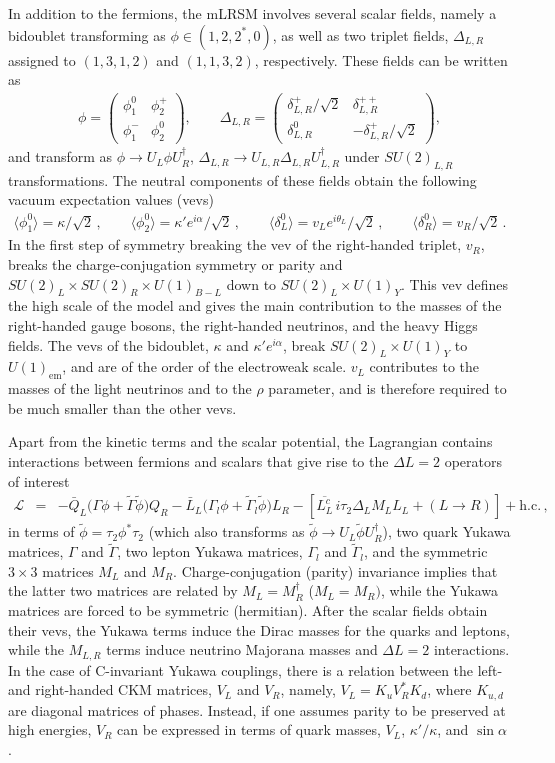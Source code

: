\documentclass[letterpaper,11pt]{article}
\newcommand{\al}{\alpha}
\newcommand{\ka}{\kappa}
\newcommand{\vL}{\ensuremath{\mathcal{L}}}
\newcommand{\Dt}{\Delta}
\newcommand{\GA}{\Gamma}
\newcommand{\TG}{\tilde\Gamma}
\newcommand{\bea}{\begin{eqnarray}}
\newcommand{\eea}{\end{eqnarray}}
\newcommand{\bma}{\begin{pmatrix}}
\newcommand{\ema}{\end{pmatrix}}
\begin{document}
In addition to the fermions, the mLRSM involves several scalar fields, namely a bidoublet transforming as $\phi\in (1, 2,2^*,0)$, as well as two triplet fields, $\Delta_{L,R}$ assigned to $(1,3,1,2)$ and $(1, 1,3,2)$, respectively.
These fields can be written as 
\bea \phi = \bma \phi_1^0 & \phi_2^+\\ \phi_1^- & \phi_2^0 \ema ,\qquad
\Delta_{L,R} = \bma \delta^+_{L,R}/\sqrt{2} & \delta^{++}_{L,R} \\ \delta^0_{L,R} & -\delta^+_{L,R}/\sqrt{2} \ema ,
\label{scalars}\eea
and transform as $\phi\to U_L\phi U_R^\dagger$, $\Dt_{L,R}\to U_{L,R}\Dt_{L,R} U_{L,R}^\dagger$ under $SU(2)_{L,R}$ transformations. The neutral components of these fields obtain the following vacuum expectation values (vevs)
\bea\label{vevs}
\langle \phi^0_1 \rangle = \kappa/\sqrt{2}\,,\qquad\langle \phi^0_2\rangle = \kappa' e^{i\al}/\sqrt{2}\,,\qquad 
\langle \delta_{L}^0 \rangle = v_{L}e^{i\theta_L}/\sqrt{2}\,,\qquad \langle \delta_{R}^0 \rangle = v_R/\sqrt{2}\,.
\eea 
In the first step of symmetry breaking the vev of the right-handed triplet, $v_R$, breaks the charge-conjugation symmetry or parity and $SU(2)_L \times SU(2)_R \times U(1)_{B-L}$ down to $SU(2)_L \times U(1)_{Y}$. This vev  defines the high scale of the model 
and gives the main contribution to the masses of the
right-handed gauge bosons, the right-handed neutrinos, and the heavy Higgs fields. The vevs of the bidoublet, $\ka$ and $\ka'e^{i\al}$,  break $SU(2)_L \times U(1)_{Y}$ to $U(1)_{\text{em}}$, and are of the order of the electroweak scale. $v_L$ contributes to the masses of the light neutrinos and to the $\rho$ parameter, and is therefore required to be much smaller than the other vevs. 

Apart from the kinetic terms  and the scalar potential, the Lagrangian contains interactions between fermions and scalars that give rise to the $\Dt L=2$ operators of interest 
\bea \label{eq:LRLagrangian}
\vL &=& 
-\bar Q_L\big( \GA \phi + \TG \tilde \phi \big)Q_R - \bar L_L\big( \GA_l \phi + \TG_l \tilde \phi \big)L_R- \left[
\overline{L_L^c}  \,  i\tau_2\Dt_L M_L L_L+ (L\rightarrow R)\right]+\text{h.c.}\,,\eea
 in terms of $\tilde \phi=\tau_2 \phi^* \tau_2$
 (which also transforms as $\tilde \phi \to U_L \tilde \phi U_R^\dagger$), two quark Yukawa matrices, $\Gamma$ and $\tilde \Gamma$, two lepton Yukawa matrices, $\Gamma_l$ and $\tilde \Gamma_l$, and the symmetric $3\times 3$ matrices   $M_{L}$ and $M_{R}$. Charge-conjugation (parity) invariance implies that the latter two matrices are related by   $M_L=M_R^\dagger$ ($M_L= M_R)$, while the Yukawa matrices are forced to be symmetric (hermitian). After the scalar fields obtain their vevs, the Yukawa terms induce the Dirac masses for the quarks and leptons, while the $M_{L,R}$ terms induce neutrino Majorana masses and $\Dt L=2$ interactions.  
In the case of C-invariant Yukawa couplings,  there is a relation between the left- and right-handed CKM matrices, $V_L$ and $V_R$, namely, $V_L =  K_u V_R^* K_d$, where $K_{u,d}$ are diagonal matrices of phases. Instead, if one assumes parity to be preserved at high energies, $V_R$ can be expressed in terms of quark masses, $V_L$,  $\ka'/\ka$, and $ \sin\al$ \cite{Senjanovic:2015yea}.
 
\end{document}
